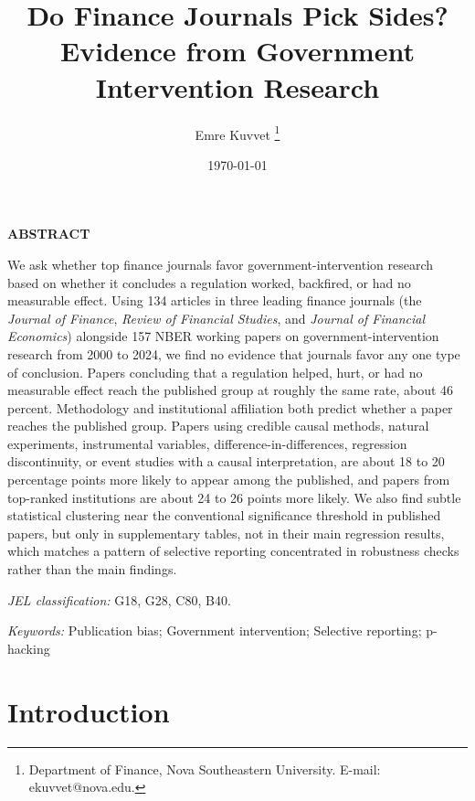 \documentclass[12pt]{article}
\title{Do Finance Journals Pick Sides? Evidence from Government Intervention Research%
}
\author{Emre Kuvvet%
        \thanks{Department of Finance, Nova Southeastern University. E-mail: ekuvvet@nova.edu.}}
\date{\today}
\newcommand{\JF}{\textit{Journal of Finance}}
\newcommand{\RFS}{\textit{Review of Financial Studies}}
\newcommand{\JFE}{\textit{Journal of Financial Economics}}
\begin{document}
\hypersetup{pageanchor=false}
\maketitle
\thispagestyle{empty}

\vspace{4pt}
\begin{center}{\normalsize\bf ABSTRACT}\end{center}
\begin{singlespace}
\noindent\small
We ask whether top finance journals favor government-intervention
research based on whether it concludes a regulation worked, backfired,
or had no measurable effect.  Using 134 articles in three leading finance journals (the
\JF{}, \RFS{}, and \JFE{}) alongside 157 NBER working papers on
government-intervention research from 2000 to 2024, we find no evidence
that journals favor any one type of conclusion.  Papers concluding that
a regulation helped, hurt, or had no measurable effect reach the
published group at roughly the same rate, about 46 percent.  Methodology
and institutional affiliation both predict whether a paper reaches the
published group.  Papers using credible causal
methods, natural experiments, instrumental variables,
difference-in-differences, regression discontinuity, or event studies
with a causal interpretation, are about 18 to 20 percentage points
more likely to appear among the published, and papers from top-ranked
institutions are about 24 to 26 points more likely.  We also find subtle statistical clustering near
the conventional significance threshold in published papers, but only
in supplementary tables, not in their main regression results, which
matches a pattern of selective reporting concentrated in robustness
checks rather than the main findings.
\end{singlespace}
\vspace{4pt}
\noindent\small\textit{JEL classification:} G18, G28, C80, B40.

\noindent\small\textit{Keywords:} Publication bias; Government intervention; Selective reporting; p-hacking

\clearpage
\hypersetup{pageanchor=true}
\setcounter{page}{1}

\section{Introduction}
\label{sec:intro}
\end{document}
